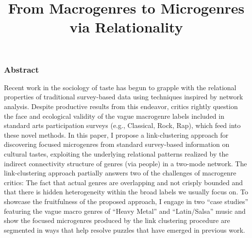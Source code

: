\documentclass[a4paper,12pt]{extarticle}
\title{From Macrogenres to Microgenres via Relationality}
\begin{document}
\maketitle
\subsubsection*{Abstract} 
Recent work in the sociology of taste has begun to grapple with the relational properties of traditional survey-based data using techniques inspired by network analysis. Despite productive results from this endeavor, critics rightly question the face and ecological validity of the vague macrogenre labels included in standard arts participation surveys (e.g., Classical, Rock, Rap), which feed into these novel methods. In this paper, I propose a link-clustering approach for discovering focused microgenres from standard survey-based information on cultural tastes, exploiting the underlying relational patterns realized by the indirect connectivity structure of genres (via people) in a two-mode network. The link-clustering approach partially answers two of the challenges of macrogenre critics: The fact that actual genres are overlapping and not crisply bounded and that there is hidden heterogeneity within the broad labels we usually focus on. To showcase the fruitfulness of the proposed approach, I engage in two ``case studies'' featuring the vague macro genres of ``Heavy Metal'' and ``Latin/Salsa'' music and show the focused microgenres produced by the link clustering procedure are segmented in ways that help resolve puzzles that have emerged in previous work. 
\newpage
\end{document}
